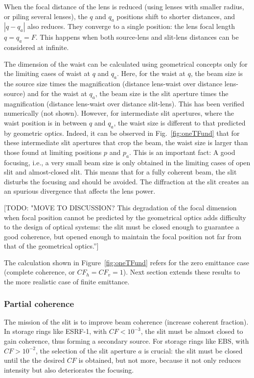\documentclass{iucr}              %
\newcommand{\todo}[1]{{\color{red}[TODO: "#1'']}}
\begin{document}
When the focal distance of the lens is reduced (using lenses with smaller radius, or piling several lenses), the $q$ and $q_a$ positions shift to shorter distances,
and  $|q-q_a|$ also reduces. They converge to a single position: the lens focal length $q=q_a=F$. This happens when both source-lens and slit-lens distances can be considered at infinite. 

The dimension of the waist can be calculated using geometrical concepts only for the limiting cases of waist at $q$ and $q_a$. Here, for the waist at $q$, the beam size is the source size times the magnification (distance lens-waist over distance lens-source) and for the waist at $q_a$, the beam size is the slit aperture times the magnification (distance lens-waist over distance slit-lens). This has been verified numerically (not shown). However, for intermediate slit apertures, where the waist position is in between $q$ and $q_a$, the waist size is different to that predicted by geometric optics.
Indeed, it can be observed in Fig.~\ref{fig:oneTFund} that for these intermediate slit apertures that crop the beam, the waist size is larger than those found at limiting positions $p$ and $p_a$.
This is an important fact: A good focusing, i.e., a very small beam size is only obtained in the limiting cases of open slit and almost-closed slit. This means that for a fully coherent beam, the slit disturbs the focusing and should be avoided. The diffraction at the slit creates an an spurious divergence that affects the lens power. 

\todo{MOVE TO DISCUSSION? This degradation of the focal dimension when focal position cannot be predicted by the geometrical optics adds difficulty to the design of optical systems: the slit must be closed enough to guarantee a good coherence, but opened enough to maintain the focal position not far from that of the geometrical optics.} 


The calculation shown in Figure~\ref{fig:oneTFund} refers for the zero emittance case (complete coherence, or $CF_h=CF_v=1$). Next section extends these results to the more realistic case of finite emittance.

\subsubsection{Partial coherence} The mission of the slit is to improve beam coherence (increase coherent fraction). In storage rings like ESRF-1, with $CF<10^{-3}$, the slit must be almost closed to gain coherence, thus forming a secondary source. For storage rings like EBS, with $CF > 10^{-2}$, the selection of the slit aperture $a$ is crucial: the slit must be closed until the the desired $CF$ is obtained, but not more, because it not only reduces intensity but also deteriorates the focusing. 
\end{document}
